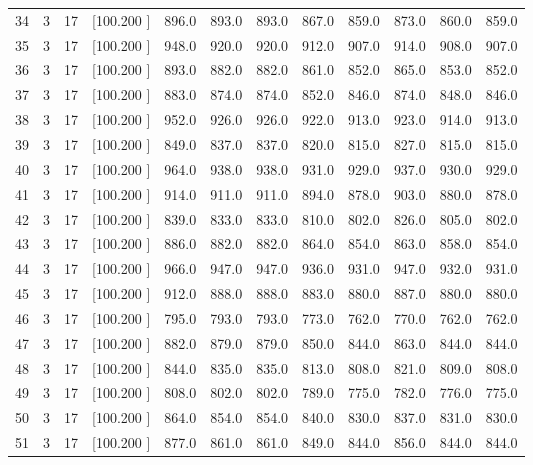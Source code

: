 \documentclass[12pt,a4paper]{article}
\begin{document}
\begin{center}
{\begin{tabular}{r r r r r r r r r r r r}
  34&  3& 17&[100.200   ]&   896.0&   893.0&   893.0&   867.0&   859.0&   873.0&   860.0&   859.0\\[-0.02in]
  35&  3& 17&[100.200   ]&   948.0&   920.0&   920.0&   912.0&   907.0&   914.0&   908.0&   907.0\\[-0.02in]
  36&  3& 17&[100.200   ]&   893.0&   882.0&   882.0&   861.0&   852.0&   865.0&   853.0&   852.0\\[-0.02in]
  37&  3& 17&[100.200   ]&   883.0&   874.0&   874.0&   852.0&   846.0&   874.0&   848.0&   846.0\\[-0.02in]
  38&  3& 17&[100.200   ]&   952.0&   926.0&   926.0&   922.0&   913.0&   923.0&   914.0&   913.0\\[-0.02in]
  39&  3& 17&[100.200   ]&   849.0&   837.0&   837.0&   820.0&   815.0&   827.0&   815.0&   815.0\\[-0.02in]
  40&  3& 17&[100.200   ]&   964.0&   938.0&   938.0&   931.0&   929.0&   937.0&   930.0&   929.0\\[-0.02in]
  41&  3& 17&[100.200   ]&   914.0&   911.0&   911.0&   894.0&   878.0&   903.0&   880.0&   878.0\\[-0.02in]
  42&  3& 17&[100.200   ]&   839.0&   833.0&   833.0&   810.0&   802.0&   826.0&   805.0&   802.0\\[-0.02in]
  43&  3& 17&[100.200   ]&   886.0&   882.0&   882.0&   864.0&   854.0&   863.0&   858.0&   854.0\\[-0.02in]
  44&  3& 17&[100.200   ]&   966.0&   947.0&   947.0&   936.0&   931.0&   947.0&   932.0&   931.0\\[-0.02in]
  45&  3& 17&[100.200   ]&   912.0&   888.0&   888.0&   883.0&   880.0&   887.0&   880.0&   880.0\\[-0.02in]
  46&  3& 17&[100.200   ]&   795.0&   793.0&   793.0&   773.0&   762.0&   770.0&   762.0&   762.0\\[-0.02in]
  47&  3& 17&[100.200   ]&   882.0&   879.0&   879.0&   850.0&   844.0&   863.0&   844.0&   844.0\\[-0.02in]
  48&  3& 17&[100.200   ]&   844.0&   835.0&   835.0&   813.0&   808.0&   821.0&   809.0&   808.0\\[-0.02in]
  49&  3& 17&[100.200   ]&   808.0&   802.0&   802.0&   789.0&   775.0&   782.0&   776.0&   775.0\\[-0.02in]
  50&  3& 17&[100.200   ]&   864.0&   854.0&   854.0&   840.0&   830.0&   837.0&   831.0&   830.0\\[-0.02in]
  51&  3& 17&[100.200   ]&   877.0&   861.0&   861.0&   849.0&   844.0&   856.0&   844.0&   844.0\\[-0.02in]

\end{tabular}}
\end{center}
\end{document}
